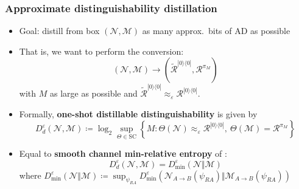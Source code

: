 \documentclass[usenames,dvipsnames,handout]{beamer}
\begin{document}
\begin{frame}
\frametitle{Approximate distinguishability distillation}

\begin{itemize}

\pause
\item Goal: distill from box $(\mathcal{N},\mathcal{M})$ as many approx.~bits of AD as possible

\pause
\item That is, we want to perform the conversion:
$$
(\mathcal{N},\mathcal{M}) \rightarrow (\widetilde{\mathcal{R}}^{|0\rangle\!\langle 0 |}, \mathcal{R}^{\pi_M})
$$
with $M$ as large as possible and $\widetilde{\mathcal{R}}^{|0\rangle\!\langle 0 |} \approx_{\varepsilon} \mathcal{R}^{|0\rangle\!\langle 0 |}$.

\pause
\item Formally, {\color{MidnightBlue}\textbf{one-shot distillable distinguishability}}  is given by
$$
D_{d}^{\varepsilon}(\mathcal{N}  ,\mathcal{M})\coloneqq 
\log_{2}\sup_{\Theta\in\text{SC}}\left\{  M:
\Theta(\mathcal{N}
)\approx_{\varepsilon}\mathcal{R}^{|0\rangle\!\langle 0 |},\ \Theta(\mathcal{M})=\mathcal{R}^{\pi_M}\right\}  
$$

\pause
\item Equal to {\color{MidnightBlue}\textbf{smooth channel min-relative entropy}} of \cite{Cooney2016}:
$$
D_{d}^{\varepsilon}(\mathcal{N}  ,\mathcal{M}) = D_{\min}^{\varepsilon}(\mathcal{N}  \Vert\mathcal{M})
$$
where $D_{\min}^{\varepsilon}(\mathcal{N}  \Vert\mathcal{M}) \coloneqq  \sup_{\psi_{RA}} D_{\min}^{\varepsilon}(\mathcal{N}_{A \to B} (\psi_{RA}) \Vert \mathcal{M}_{A\to B}(\psi_{RA}))$

\end{itemize}

\end{frame}
\end{document}
